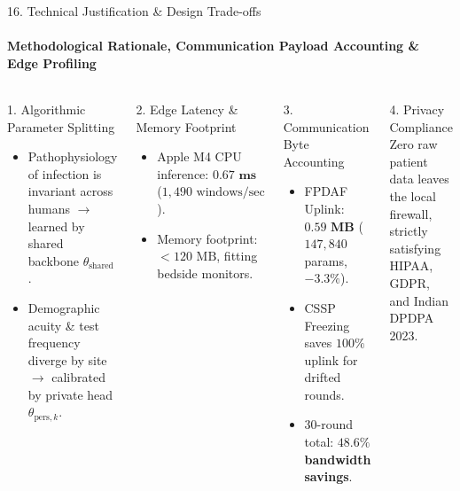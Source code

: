 \documentclass[aspectratio=169, 10pt]{beamer}
\begin{document}
\begin{frame}{16. Technical Justification \& Design Trade-offs}
    \framesubtitle{Methodological Rationale, Communication Payload Accounting \& Edge Profiling}
    \begin{columns}[T]
        \begin{block}{1. Algorithmic Parameter Splitting}
            \scriptsize
            \begin{itemize}
                \item Pathophysiology of infection is invariant across humans $\rightarrow$ learned by shared backbone $\theta_{\text{shared}}$.
                \item Demographic acuity \& test frequency diverge by site $\rightarrow$ calibrated by private head $\theta_{\text{pers}, k}$.
            \end{itemize}
        \end{block}

        \begin{block}{2. Edge Latency \& Memory Footprint}
            \scriptsize
            \begin{itemize}
                \item Apple M4 CPU inference: $\mathbf{0.67\text{ ms}}$ ($1,490\text{ windows/sec}$).
                \item Memory footprint: $< 120\text{ MB}$, fitting bedside monitors.
            \end{itemize}
        \end{block}

        \begin{block}{3. Communication Byte Accounting}
            \scriptsize
            \begin{itemize}
                \item FPDAF Uplink: $\mathbf{0.59\text{ MB}}$ ($147,840$ params, $-3.3\%$).
                \item CSSP Freezing saves $100\%$ uplink for drifted rounds.
                \item 30-round total: \textbf{$48.6\%$ bandwidth savings}.
            \end{itemize}
        \end{block}

        \begin{block}{4. Privacy Compliance}
            \scriptsize
            Zero raw patient data leaves the local firewall, strictly satisfying HIPAA, GDPR, and Indian DPDPA 2023.
        \end{block}
    \end{columns}
\end{frame}
\end{document}
